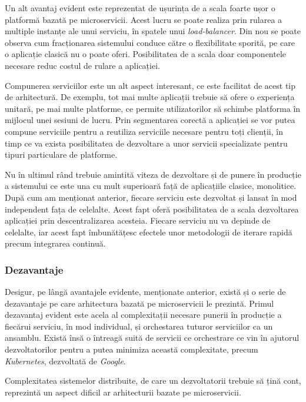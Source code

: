 Un alt avantaj evident este reprezentat de ușurința de a scala foarte ușor o platformă bazată pe microservicii. Acest lucru se poate realiza prin rularea a multiple instanțe ale unui serviciu, în spatele unui \textit{load-balancer}. Din nou se poate observa cum fracționarea sistemului conduce către o flexibilitate sporită, pe care o aplicație clasică nu o poate oferi. Posibilitatea de a scala doar componentele necesare reduc costul de rulare a aplicației.

Compunerea serviciilor este un alt aspect interesant, ce este facilitat de acest tip de arhitectură. De exemplu, tot mai multe aplicații trebuie să ofere o experiența unitară, pe mai multe platforme, ce permite utilizatorilor să schimbe platforma în mijlocul unei sesiuni de lucru. Prin segmentarea corectă a aplicației se vor putea compune serviciile pentru a reutiliza serviciile necesare pentru toți clienții, în timp ce va exista posibilitatea de dezvoltare a unor servicii specializate pentru tipuri particulare de platforme. 

Nu în ultimul rând trebuie amintită viteza de dezvoltare și de punere în producție a sistemului ce este una cu mult superioară față de aplicațiile clasice, monolitice. După cum am menționat anterior, fiecare serviciu este dezvoltat și lansat în mod independent fața de celelalte. Acest fapt oferă posibilitatea de a scala dezvoltarea aplicației prin descentralizarea acesteia. Fiecare serviciu nu va depinde de celelalte, iar acest fapt îmbunătățesc efectele unor metodologii de iterare rapidă precum integrarea continuă.

\subsubsection{Dezavantaje}

Desigur, pe lângă avantajele evidente, menționate anterior, există și o serie de dezavantaje pe care arhitectura bazată pe microservicii le prezintă\cite{onmicro}. Primul dezavantaj evident este acela al complexitații necesare punerii în producție a fiecărui serviciu, în mod individual, și orchestarea tuturor serviciilor ca un ansamblu. Există însă o întreagă suită de servicii ce orchestrare ce vin în ajutorul dezvoltatorilor pentru a putea minimiza această complexitate, precum \textit{Kubernetes}, dezvoltată de \textit{Google}.

Complexitatea sistemelor distribuite, de care un dezvoltatorii trebuie să țină cont, reprezintă un aspect dificil ar arhitecturii bazate pe microservicii. 

